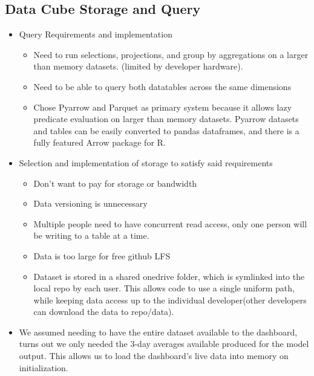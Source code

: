 \documentclass[
  12pt,
  letterpaper,
  DIV=11,
  numbers=noendperiod]{scrartcl}
\providecommand{\tightlist}{%
  \setlength{\itemsep}{0pt}\setlength{\parskip}{0pt}}\usepackage{longtable,booktabs,array}
\begin{document}
\subsection{Data Cube Storage and
Query}\label{data-cube-storage-and-query}

\begin{itemize}
\tightlist
\item
  Query Requirements and implementation

  \begin{itemize}
  \tightlist
  \item
    Need to run selections, projections, and group by aggregations on a
    larger than memory datasets. (limited by developer hardware).\\
  \item
    Need to be able to query both datatables across the same
    dimensions\\
  \item
    Chose Pyarrow and Parquet as primary system because it allows lazy
    predicate evaluation on larger than memory datasets. Pyarrow
    datasets and tables can be easily converted to pandas dataframes,
    and there is a fully featured Arrow package for R.\\
  \end{itemize}
\item
  Selection and implementation of storage to satisfy said requirements

  \begin{itemize}
  \tightlist
  \item
    Don't want to pay for storage or bandwidth\\
  \item
    Data versioning is unnecessary\\
  \item
    Multiple people need to have concurrent read access, only one person
    will be writing to a table at a time.\\
  \item
    Data is too large for free github LFS\\
  \item
    Dataset is stored in a shared onedrive folder, which is symlinked
    into the local repo by each user. This allows code to use a single
    uniform path, while keeping data access up to the individual
    developer(other developers can download the data to repo/data).
  \end{itemize}
\item
  We assumed needing to have the entire dataset available to the
  dashboard, turns out we only needed the 3-day averages available
  produced for the model output. This allows us to load the dashboard's
  live data into memory on initialization.
\end{itemize}
\end{document}
